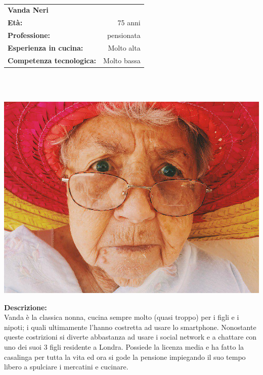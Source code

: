 \hrulefill\\
\begin{minipage}{.75\textwidth}
\begin{tabular}{l |r }
	\textbf{Vanda Neri} & \\
	\textbf{Età:} & 75 anni\\
	\textbf{Professione:} & pensionata\\
	\textbf{Esperienza in cucina:} & Molto alta\\
	\textbf{Competenza tecnologica:} & Molto bassa\\
\end{tabular}\\\\
\end{minipage}
\begin{minipage}{.24\textwidth}
	\includegraphics[width=\textwidth]{img/personas/vanda}
\end{minipage}
	
	\textbf{Descrizione:}\\
	Vanda è la classica nonna, cucina sempre molto (quasi troppo) per i
	figli e i nipoti; i quali ultimamente l'hanno costretta ad usare lo
	smartphone.  Nonostante queste costrizioni si diverte abbastanza ad
	usare i social network e a chattare con uno dei suoi 3 figli residente a
	Londra.  Possiede la licenza media e ha fatto la casalinga per tutta la
	vita ed ora si gode la pensione impiegando il suo tempo libero a
	spulciare i mercatini e cucinare.
